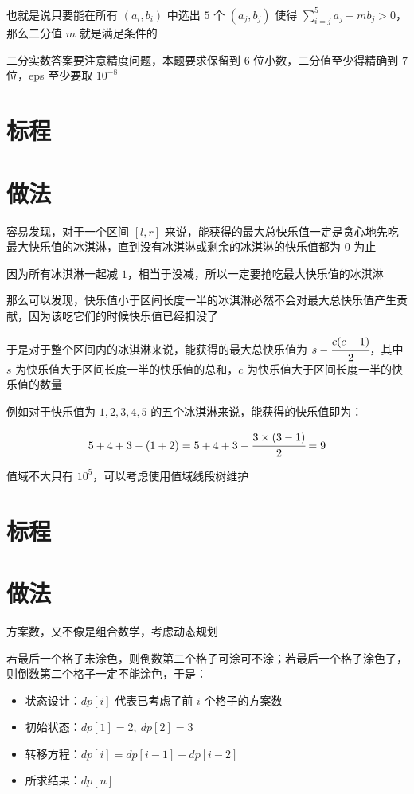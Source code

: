 \documentclass{ctsol}
\begin{document}
也就是说只要能在所有 $(a_i,b_i)$ 中选出 $5$ 个 $(a_j,b_j)$ 使得 $\sum_{i=j}^{5}a_j-mb_j > 0$，那么二分值 $m$ 就是满足条件的

二分实数答案要注意精度问题，本题要求保留到 $6$ 位小数，二分值至少得精确到 $7$ 位，eps 至少要取 ${10}^{-8}$

\section*{标程}


\makesolution
\section*{做法}

容易发现，对于一个区间 $[l,r]$ 来说，能获得的最大总快乐值一定是贪心地先吃最大快乐值的冰淇淋，直到没有冰淇淋或剩余的冰淇淋的快乐值都为 $0$ 为止

因为所有冰淇淋一起减 $1$，相当于没减，所以一定要抢吃最大快乐值的冰淇淋

那么可以发现，快乐值小于区间长度一半的冰淇淋必然不会对最大总快乐值产生贡献，因为该吃它们的时候快乐值已经扣没了

于是对于整个区间内的冰淇淋来说，能获得的最大总快乐值为 $s-\cfrac{c(c-1)}{2}$，其中 $s$ 为快乐值大于区间长度一半的快乐值的总和，$c$ 为快乐值大于区间长度一半的快乐值的数量

例如对于快乐值为 $1,2,3,4,5$ 的五个冰淇淋来说，能获得的快乐值即为：

$$5+4+3-(1+2) = 5+4+3-\cfrac{3 \times (3-1)}{2} = 9$$

值域不大只有 ${10}^5$，可以考虑使用值域线段树维护

\section*{标程}


\makesolution
\section*{做法}

方案数，又不像是组合数学，考虑动态规划

若最后一个格子未涂色，则倒数第二个格子可涂可不涂；若最后一个格子涂色了，则倒数第二个格子一定不能涂色，于是：

\begin{itemize}
    \item 状态设计：$dp[i]$ 代表已考虑了前 $i$ 个格子的方案数
    \item 初始状态：$dp[1] = 2,~dp[2] = 3$
    \item 转移方程：$dp[i] = dp[i-1] + dp[i-2]$
    \item 所求结果：$dp[n]$
\end{itemize}
\end{document}
